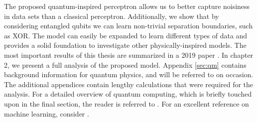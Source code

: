 \noindent The proposed quantum-inspired perceptron allows us to better capture noisiness in data sets than a classical perceptron. Additionally, we show that by considering entangled qubits we can learn non-trivial separation boundaries, such as XOR. The model can easily be expanded to learn different types of data and provides a solid foundation to investigate other physically-inspired models. The most important results of this thesis are summarized in a 2019 paper \cite{Wiersema2019}. In chapter 2, we present a full analysis of the proposed model. Appendix \ref{sec:qm} contains background information for quantum physics, and will be referred to on occasion. The additional appendices contain lengthy calculations that were required for the analysis. For a detailed overview of quantum computing, which is briefly touched upon in the final section, the reader is referred to \cite{Nielsen2011}. For an excellent reference on machine learning, consider \cite{Murphy2012}.

